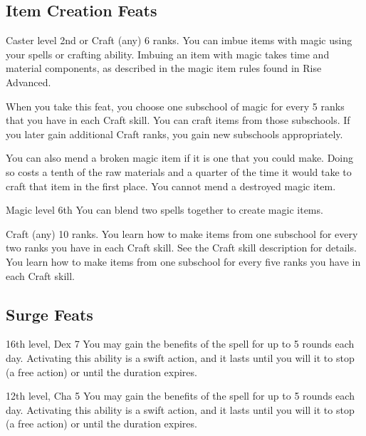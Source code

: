 \subsection{Item Creation Feats}

 Caster level 2nd or Craft (any) 6 ranks.
 You can imbue items with magic using your spells or crafting ability. Imbuing an item with magic takes time and material components, as described in the magic item rules found in Rise Advanced.

When you take this feat, you choose one subschool of magic for every 5 ranks that you have in each Craft skill. You can craft items from those subschools. If you later gain additional Craft ranks, you gain new subschools appropriately.

You can also mend a broken magic item if it is one that you could make. Doing so costs a tenth of the raw materials and a quarter of the time it would take to craft that item in the first place. You cannot mend a destroyed magic item.

 Magic level 6th
 You can blend two spells together to create magic items. 

 Craft (any) 10 ranks.
 You learn how to make items from one subschool for every two ranks you have in each Craft skill. See the Craft skill description for details.
 You learn how to make items from one subschool for every five ranks you have in each Craft skill.

\subsection{Surge Feats}

\featpre 16th level, Dex 7
\featben You may gain the benefits of the  spell for up to 5 rounds each day. Activating this ability is a swift action, and it lasts until you will it to stop (a free action) or until the duration expires.

\featpre 12th level, Cha 5
\featben You may gain the benefits of the  spell for up to 5 rounds each day. Activating this ability is a swift action, and it lasts until you will it to stop (a free action) or until the duration expires.

